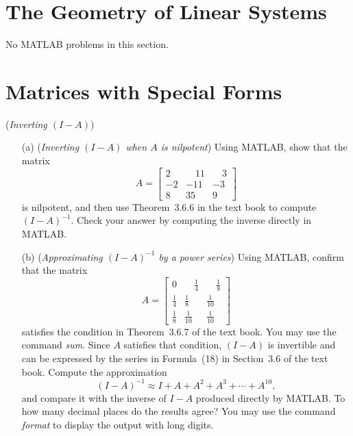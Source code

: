 \section{The Geometry of Linear Systems}


No MATLAB problems in this section.

\newpage
\section{Matrices with Special Forms}

\begin{exer} (\textit{Inverting $(I-A)$})
\begin{enumerate}
\item[(a)]  (\textit{Inverting $(I-A)$ when $A$ is nilpotent}) Using MATLAB, show that the matrix 
$$
A = \left[\begin{array}{rrr} 2&\quad 11&\quad 3\\ -2 & -11 & -3\\ 8 & 35 & 9 \end{array} \right]
$$
is nilpotent, and then use Theorem~3.6.6 in the text book to compute $(I-A)^{-1}$. Check your answer by computing the inverse directly in MATLAB.
\vspace{1mm}

\item[(b)] (\textit{Approximating $(I-A)^{-1}$ by a power series}) Using MATLAB, confirm that the matrix
$$
A = \left[\displaystyle\begin{array}{rrr} 0&\quad \displaystyle\frac{1}{4}&\quad \displaystyle\frac{1}{8}\\ \displaystyle\frac{1}{4} & \displaystyle\frac{1}{8} & \displaystyle\frac{1}{10}\\ \displaystyle\frac{1}{8} & \displaystyle\frac{1}{10} & \displaystyle\frac{1}{10} \end{array} \right]
$$
satisfies the condition in Theorem~3.6.7 of the text book. You may use the command \textit{sum}. Since $A$ satisfies that condition, $(I-A)$ is invertible and can be expressed by the series in Formula~(18) in Section~3.6 of the text book. Compute the approximation $$(I-A)^{-1}\approx I+A+A^2+A^3+\cdots+A^{10},$$ and compare it with the inverse of $I-A$ produced directly by MATLAB. To how many decimal places do the results agree? You may use the command \textit{format} to display the output with long digits.

\end{enumerate}
\end{exer}


